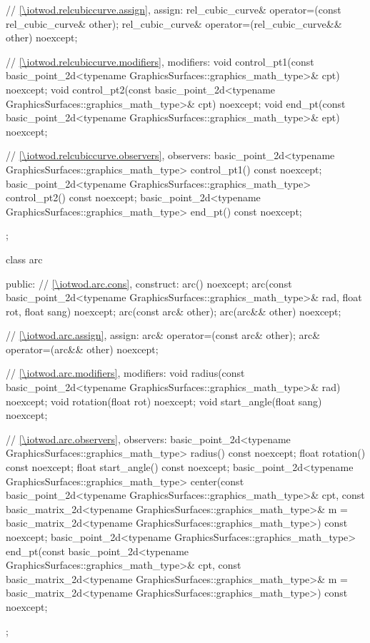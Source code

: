 \begin{codeblock}
{{{      // \ref{\iotwod.relcubiccurve.assign}, assign:
      rel_cubic_curve& operator=(const rel_cubic_curve& other);
      rel_cubic_curve& operator=(rel_cubic_curve&& other) noexcept;

      // \ref{\iotwod.relcubiccurve.modifiers}, modifiers:
      void control_pt1(const basic_point_2d<typename
        GraphicsSurfaces::graphics_math_type>& cpt) noexcept;
      void control_pt2(const basic_point_2d<typename
        GraphicsSurfaces::graphics_math_type>& cpt) noexcept;
      void end_pt(const basic_point_2d<typename
        GraphicsSurfaces::graphics_math_type>& ept) noexcept;

      // \ref{\iotwod.relcubiccurve.observers}, observers:
      basic_point_2d<typename GraphicsSurfaces::graphics_math_type> control_pt1() const noexcept;
      basic_point_2d<typename GraphicsSurfaces::graphics_math_type> control_pt2() const noexcept;
      basic_point_2d<typename GraphicsSurfaces::graphics_math_type> end_pt() const noexcept;
    };

    class arc {
    public:
      // \ref{\iotwod.arc.cons}, construct:
      arc() noexcept;
      arc(const basic_point_2d<typename GraphicsSurfaces::graphics_math_type>& rad, float rot, float sang) noexcept;
      arc(const arc& other);
      arc(arc&& other) noexcept;

      // \ref{\iotwod.arc.assign}, assign:
      arc& operator=(const arc& other);
      arc& operator=(arc&& other) noexcept;

      // \ref{\iotwod.arc.modifiers}, modifiers:
      void radius(const basic_point_2d<typename GraphicsSurfaces::graphics_math_type>& rad) noexcept;
      void rotation(float rot) noexcept;
      void start_angle(float sang) noexcept;

      // \ref{\iotwod.arc.observers}, observers:
      basic_point_2d<typename GraphicsSurfaces::graphics_math_type> radius() const noexcept;
      float rotation() const noexcept;
      float start_angle() const noexcept;
      basic_point_2d<typename GraphicsSurfaces::graphics_math_type> center(const basic_point_2d<typename
        GraphicsSurfaces::graphics_math_type>& cpt, const basic_matrix_2d<typename
        GraphicsSurfaces::graphics_math_type>& m = basic_matrix_2d<typename
        GraphicsSurfaces::graphics_math_type>{}) const noexcept;
      basic_point_2d<typename GraphicsSurfaces::graphics_math_type> end_pt(const basic_point_2d<typename
        GraphicsSurfaces::graphics_math_type>& cpt, const basic_matrix_2d<typename
        GraphicsSurfaces::graphics_math_type>& m = basic_matrix_2d<typename
        GraphicsSurfaces::graphics_math_type>{}) const noexcept;
    };

}}
\end{codeblock}
